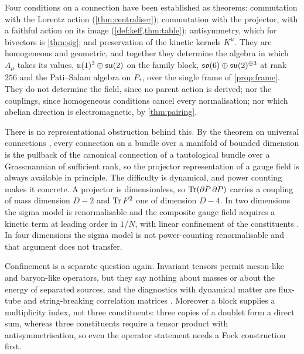 Four conditions on a connection have been established as theorems: commutation with the Lorentz action
(\cref{thm:centraliser}); commutation with the projector, with a faithful action on its image (\cref{def:keff,thm:table});
antisymmetry, which for bivectors is \cref{thm:sig}; and preservation of the kinetic kernels $K^\mu$. They are homogeneous and
geometric, and together they determine the algebra in which $A_\mu$ takes its values, $\mathfrak{u}(1)^3\oplus\mathfrak{su}(2)$ on the family block,
$\mathfrak{so}(6)\oplus\mathfrak{su}(2)^{\oplus3}$ at rank $256$ and the Pati--Salam algebra on $P_*$, over the single frame of \cref{prop:frame}. They do not
determine the field, since no parent action is derived; nor the couplings, since homogeneous conditions cancel every
normalisation; nor which abelian direction is electromagnetic, by \cref{thm:pairing}.

There is no representational obstruction behind this. By the theorem on universal connections \cite{NarasimhanRamanan}, every
connection on a bundle over a manifold of bounded dimension is the pullback of the canonical connection of a tautological bundle
over a Grassmannian of sufficient rank, so the projector representation of a gauge field is always available in principle. The
difficulty is dynamical, and power counting makes it concrete. A projector is dimensionless, so $\operatorname{Tr}(\partial P\,\partial P)$
carries a coupling of mass dimension $D-2$ and $\operatorname{Tr} F^2$ one of dimension $D-4$. In two dimensions the sigma model is
renormalisable and the composite gauge field acquires a kinetic term at leading order in $1/N$, with linear confinement of the
constituents \cite{DAddaDiVecchiaLuscher,Witten79}. In four dimensions the sigma model is not power-counting renormalisable and that
argument does not transfer.

Confinement is a separate question again. Invariant tensors permit meson-like and baryon-like operators, but they say nothing
about masses or about the energy of separated sources, and the diagnostics with dynamical matter are flux-tube and string-breaking
correlation matrices \cite{Bali05}. Moreover a block supplies a multiplicity index, not three constituents: three copies of a doublet
form a direct sum, whereas three constituents require a tensor product with antisymmetrisation, so even the operator statement needs
a Fock construction first.


